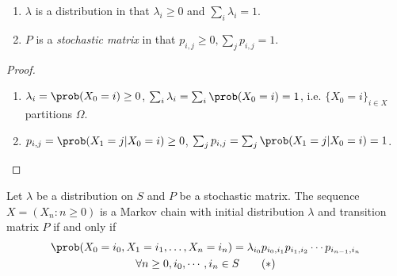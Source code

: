 \documentclass[a4paper]{article}
\begin{document}
\begin{proposition}\leavevmode
  \begin{enumerate}
  \item $\lambda$ is a distribution in that $\lambda_i\geq 0$ and $\sum_i \lambda_i = 1$.
  \item $P$ is a \emph{stochastic matrix} in that $p_{i,j} \geq 0, \sum_j p_{i,j} = 1$.
  \end{enumerate}
\end{proposition}

\begin{proof}\leavevmode
  \begin{enumerate}
  \item $\lambda_i = \prob(X_0=i) \geq 0$, $\sum_i \lambda_i = \sum_i\prob(X_0=i)=1$, i.e. $\{X_0=i\}_{i\in X}$ partitions $\Omega$.
  \item $p_{i,j} = \prob(X_1=j|X_0=i) \geq 0$, $\sum_j p_{i,j} = \sum_j \prob(X_1=j|X_0=i) = 1$.
  \end{enumerate}
\end{proof}

\begin{theorem}
  Let $\lambda$ be a distribution on $S$ and $P$ be a stochastic matrix. The sequence $X=(X_n:n \geq 0)$ is a Markov chain with initial distribution $\lambda$ and transition matrix $P$ if and only if
  \begin{multline}\label{eqn:joint probability}
    \prob(X_0=i_0, X_1=i_1, \ldots, X_n=i_n) = \lambda_{i_0} p_{i_0,i_1} p_{i_1,i_2} \cdots p_{i_{n-1}, i_n} \\
    \forall n\geq 0, i_0,\cdots, i_n \in S \tag{$\ast$}
  \end{multline}
    
\end{theorem}
\end{document}
